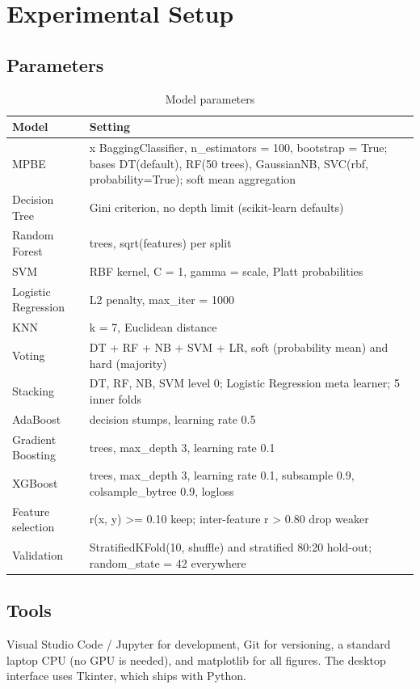 \documentclass[12pt,a4paper,oneside]{report}
\begin{document}
\chapter{Experimental Setup}
\section{Parameters}
\begin{table}[htbp]
\centering
\caption{Model parameters}
\footnotesize
\begin{tabular}{>{\raggedright\arraybackslash}p{}>{\raggedright\arraybackslash}p{}}
\hline
\textbf{Model} & \textbf{Setting} \\
\hline
MPBE & 4 x BaggingClassifier, n\_estimators = 100, bootstrap = True; bases DT(default), RF(50 trees), GaussianNB, SVC(rbf, probability=True); soft mean aggregation \\
Decision Tree & Gini criterion, no depth limit (scikit-learn defaults) \\
Random Forest & 100 trees, sqrt(features) per split \\
SVM & RBF kernel, C = 1, gamma = scale, Platt probabilities \\
Logistic Regression & L2 penalty, max\_iter = 1000 \\
KNN & k = 7, Euclidean distance \\
Voting & DT + RF + NB + SVM + LR, soft (probability mean) and hard (majority) \\
Stacking & DT, RF, NB, SVM level 0; Logistic Regression meta learner; 5 inner folds \\
AdaBoost & 100 decision stumps, learning rate 0.5 \\
Gradient Boosting & 100 trees, max\_depth 3, learning rate 0.1 \\
XGBoost & 100 trees, max\_depth 3, learning rate 0.1, subsample 0.9, colsample\_bytree 0.9, logloss \\
Feature selection & \textbar{}r(x, y)\textbar{} \textgreater{}= 0.10 keep; inter-feature \textbar{}r\textbar{} \textgreater{} 0.80 drop weaker \\
Validation & StratifiedKFold(10, shuffle) and stratified 80:20 hold-out; random\_state = 42 everywhere \\
\hline
\end{tabular}
\end{table}

\section{Tools}
Visual Studio Code / Jupyter for development, Git for versioning, a standard laptop CPU (no GPU is needed), and matplotlib for all figures. The desktop interface uses Tkinter, which ships with Python.
\end{document}
